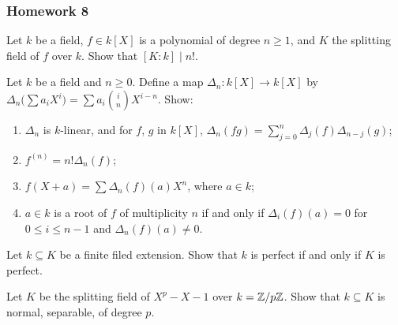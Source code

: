 \subsubsection{Homework 8}
\setcounter{exercise}{0}
\setcounter{equation}{0}

\begin{problem}
  Let \(k\) be a field, \(f\in k[X]\) is a polynomial of degree
  \(n\geq 1\), and \(K\) the splitting field of \(f\) over \(k\). Show that
  \([K:k]\mid n!\).
\end{problem}
\begin{solution}
\end{solution}

\begin{problem}
  Let \(k\) be a field and \(n\geq 0\). Define a map
  \(\Delta_n\colon k[X]\to k[X]\) by
  \(\Delta_n\bigl(\sum a_iX^i\bigr)=\sum a_i\binom{i}{n}X^{i-n}\). Show:
\begin{enumerate}[label=(\alph*),noitemsep]
\item \(\Delta_n\) is \(k\)-linear, and for \(f\), \(g\) in \(k[X]\),
  \(\Delta_n(fg)=\sum_{j=0}^n\Delta_j(f)\Delta_{n-j}(g)\);
\item \(f^{(n)}=n!\Delta_n(f)\);
\item \(f(X+a)=\sum\Delta_n(f)(a)X^n\), where \(a\in k\);
\item \(a\in k\) is a root of \(f\) of multiplicity \(n\) if and only if
  \(\Delta_i(f)(a)=0\) for \(0\leq i\leq n-1\) and
  \(\Delta_n(f)(a)\neq 0\).
\end{enumerate}
\end{problem}
\begin{solution}
\end{solution}

\begin{problem}
  Let \(k\subseteq K\) be a finite filed extension. Show that \(k\) is
  perfect if and only if \(K\) is perfect.
\end{problem}
\begin{solution}
\end{solution}

\begin{problem}
  Let \(K\) be the splitting field of \(X^p-X-1\) over
  \(k=\mathbb{Z}/p\mathbb{Z}\). Show that \(k\subseteq K\) is normal, separable, of
  degree \(p\).
\end{problem}
\begin{solution}
\end{solution}

